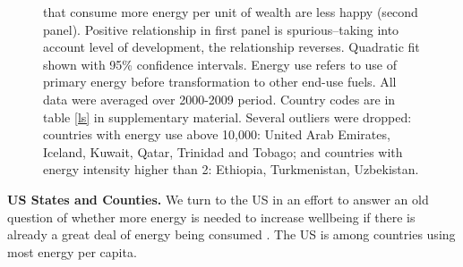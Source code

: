 \documentclass[10pt, letterpaper]{article}
\begin{document}
\begin{spacing}{1.5}
\begin{figure}[H]
{   that consume more energy per unit of wealth are less happy (second
   panel). Positive relationship in first panel is spurious--taking into
   account level of development, the relationship reverses. 
Quadratic fit shown with 95\%  confidence intervals. Energy use
   refers to use of primary energy before transformation to other end-use
   fuels. All data were averaged over 2000-2009 period.  %
 Country codes are in table \ref{ls} in supplementary material. 
 Several outliers were dropped: countries with energy use above 10,000: United Arab Emirates, Iceland, Kuwait, Qatar, Trinidad and Tobago; and countries with energy intensity higher than 2: Ethiopia, Turkmenistan, Uzbekistan.}\label{couWvsLsEnePerGdp2} 
\end{figure}

\textbf{US States and Counties.} We turn to the US in an effort to answer
an old question of whether more energy is needed to increase wellbeing if there
is already a great deal of energy being consumed \citep{mazur74}. The US is among
countries using most energy per capita.
%


\end{spacing}
\end{document}
